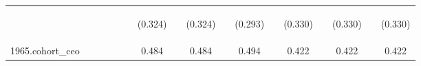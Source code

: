 \begin{center}
\begin{tabular}{lcccccccccccccccc}
\vspace{4pt} & \begin{footnotesize}\end{footnotesize} & \begin{footnotesize}\end{footnotesize} & \begin{footnotesize}\end{footnotesize} & \begin{footnotesize}\end{footnotesize} & \begin{footnotesize}\end{footnotesize} & \begin{footnotesize}(0.324)\end{footnotesize} & \begin{footnotesize}\end{footnotesize} & \begin{footnotesize}(0.324)\end{footnotesize} & \begin{footnotesize}\end{footnotesize} & \begin{footnotesize}(0.293)\end{footnotesize} & \begin{footnotesize}\end{footnotesize} & \begin{footnotesize}(0.330)\end{footnotesize} & \begin{footnotesize}\end{footnotesize} & \begin{footnotesize}(0.330)\end{footnotesize} & \begin{footnotesize}\end{footnotesize} & \begin{footnotesize}(0.330)\end{footnotesize} \\
1965.cohort\_ceo &  &  &  &  &  & 0.484 &  & 0.484 &  & 0.494 &  & 0.422 &  & 0.422 &  & 0.422 \\

\end{tabular}
\end{center}
